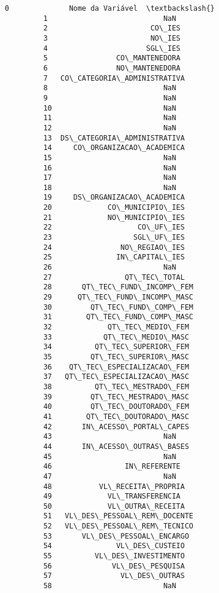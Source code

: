 \documentclass[11pt]{article}
\begin{document}
\begin{Verbatim}[commandchars=\\\{\}]
         0              Nome da Variável  \textbackslash{}
         1                           NaN   
         2                        CO\_IES   
         3                        NO\_IES   
         4                       SGL\_IES   
         5                CO\_MANTENEDORA   
         6                NO\_MANTENEDORA   
         7   CO\_CATEGORIA\_ADMINISTRATIVA   
         8                           NaN   
         9                           NaN   
         10                          NaN   
         11                          NaN   
         12                          NaN   
         13  DS\_CATEGORIA\_ADMINISTRATIVA   
         14     CO\_ORGANIZACAO\_ACADEMICA   
         15                          NaN   
         16                          NaN   
         17                          NaN   
         18                          NaN   
         19     DS\_ORGANIZACAO\_ACADEMICA   
         20             CO\_MUNICIPIO\_IES   
         21             NO\_MUNICIPIO\_IES   
         22                    CO\_UF\_IES   
         23                   SGL\_UF\_IES   
         24                NO\_REGIAO\_IES   
         25               IN\_CAPITAL\_IES   
         26                          NaN   
         27                 QT\_TEC\_TOTAL   
         28       QT\_TEC\_FUND\_INCOMP\_FEM   
         29      QT\_TEC\_FUND\_INCOMP\_MASC   
         30         QT\_TEC\_FUND\_COMP\_FEM   
         31        QT\_TEC\_FUND\_COMP\_MASC   
         32             QT\_TEC\_MEDIO\_FEM   
         33            QT\_TEC\_MEDIO\_MASC   
         34          QT\_TEC\_SUPERIOR\_FEM   
         35         QT\_TEC\_SUPERIOR\_MASC   
         36    QT\_TEC\_ESPECIALIZACAO\_FEM   
         37   QT\_TEC\_ESPECIALIZACAO\_MASC   
         38          QT\_TEC\_MESTRADO\_FEM   
         39         QT\_TEC\_MESTRADO\_MASC   
         40         QT\_TEC\_DOUTORADO\_FEM   
         41        QT\_TEC\_DOUTORADO\_MASC   
         42       IN\_ACESSO\_PORTAL\_CAPES   
         43                          NaN   
         44       IN\_ACESSO\_OUTRAS\_BASES   
         45                          NaN   
         46                 IN\_REFERENTE   
         47                          NaN   
         48           VL\_RECEITA\_PROPRIA   
         49             VL\_TRANSFERENCIA   
         50             VL\_OUTRA\_RECEITA   
         51   VL\_DES\_PESSOAL\_REM\_DOCENTE   
         52   VL\_DES\_PESSOAL\_REM\_TECNICO   
         53       VL\_DES\_PESSOAL\_ENCARGO   
         54               VL\_DES\_CUSTEIO   
         55          VL\_DES\_INVESTIMENTO   
         56              VL\_DES\_PESQUISA   
         57                VL\_DES\_OUTRAS   
         58                          NaN   
         

\end{Verbatim}
\end{document}
